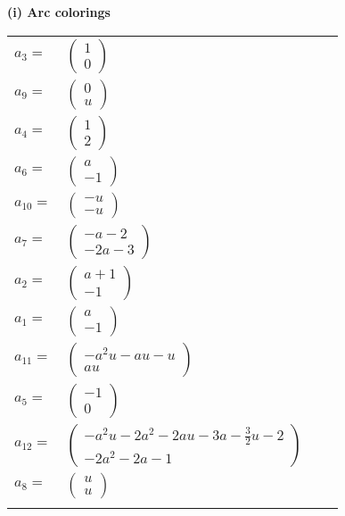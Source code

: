 \documentclass[1p]{elsarticle_modified}
\theoremstyle{definition}
\begin{document}
\flushleft \textbf{(i) Arc colorings}\\
\begin{tabular}{m{7pt} m{180pt} m{7pt} m{180pt} }
\flushright $a_{3}=$&$\begin{pmatrix}1\\0\end{pmatrix}$ \\
\flushright $a_{9}=$&$\begin{pmatrix}0\\u\end{pmatrix}$ \\
\flushright $a_{4}=$&$\begin{pmatrix}1\\2\end{pmatrix}$ \\
\flushright $a_{6}=$&$\begin{pmatrix}a\\-1\end{pmatrix}$ \\
\flushright $a_{10}=$&$\begin{pmatrix}- u\\- u\end{pmatrix}$ \\
\flushright $a_{7}=$&$\begin{pmatrix}- a-2\\-2 a-3\end{pmatrix}$ \\
\flushright $a_{2}=$&$\begin{pmatrix}a+1\\-1\end{pmatrix}$ \\
\flushright $a_{1}=$&$\begin{pmatrix}a\\-1\end{pmatrix}$ \\
\flushright $a_{11}=$&$\begin{pmatrix}- a^2 u- a u- u\\a u\end{pmatrix}$ \\
\flushright $a_{5}=$&$\begin{pmatrix}-1\\0\end{pmatrix}$ \\
\flushright $a_{12}=$&$\begin{pmatrix}- a^2 u-2 a^2-2 a u-3 a-\frac{3}{2} u-2\\-2 a^2-2 a-1\end{pmatrix}$ \\
\flushright $a_{8}=$&$\begin{pmatrix}u\\u\end{pmatrix}$\\&\end{tabular}
\end{document}
